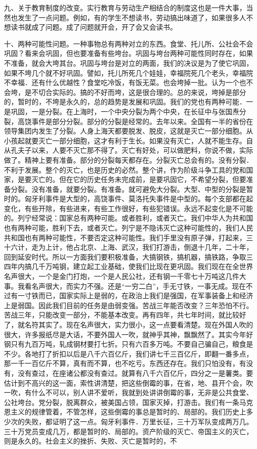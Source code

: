九、关于教育制度的改变。实行教育与劳动生产相结合的制度这也是一件大事，当然也发生了一点问题。例如，有的学生不想读书，劳动搞出味道了，如果很多人不想读书就成了问题。成了问题就开会，开了会又会读书。

十、两种可能性问题。一种事物总有两种对立的东西。食堂、托儿所、公社会不会巩固？看来会巩固，但也要准备有些垮台。巩固与垮台两种可能性同时存在，如果不准备，就会大垮其台。巩固与垮台是对立的两面，我们的决议是为了使它巩固，如果不垮几个就不好巩固。譬如，托儿所死几个娃娃，幸福院死几个老头，幸福院不幸福．还有什么优越性？食堂吃冷饭，有饭无菜。也会垮掉一批。认为一个也不会垮，是不切合实际的。搞的不好而垮，这是很合理的。总的来说，垮掉是部分的，暂时的，不垮是永久的，总的趋势是发展和巩固。我们的党也有两种可能．一是巩固，一是分裂。在上海时，一个中央分裂为两个中央，在长征中与张国焘分裂，高饶事件是部分分裂。部分的分裂是经常的。去年以来。全国有一半的省份在领导集团内发生了分裂。人身上海天都要脱发、脱皮，这就是灭亡一部分细胞。从小孩起就要灭亡一部分细胞，这才有利于生长。如果没有灭亡，人就不能生存。自从孔夫子以来，人要不灭亡那不得了。灭亡有好处，可以做肥料，你说不做，实际做了。精神上要有准备。部分的分裂每天都存在。分裂灭亡总会有的。没有分裂．不利于发展。整个的灭亡，也是历史的必然。整个讲，作为阶级斗争工具的党和国家，是要灭亡的。但在它的历史任务未完成前，是要巩固它，不希望分裂，但要准备分裂。没有准备，就要分裂。有准备。就可避免大分裂。大型、中型的分裂是暂时的。匈牙利事件是大型的，高饶事件、莫洛托失事件是中型的。每个支部都在起变化，有些开除，有些进来，有些工作很好，有些犯错误。永远不起变化是不可能的。列宁经常说：国家总有两种可能。或者胜利，或者灭亡。我们中华人为共和国也有两种可能，胜利下去，或者灭亡。列宁是不隐讳灭亡这种可能性的，我们人民共和国也有两种可能性，不要否定这种可能性。我们手里没有原子弹，打起来，三十六计，走为上计，他占北京、上海、武汉，我们打游击，倒退十几年，二十年，回到延安时代。所以一方面我们要积极准备，大搞钢铁，搞机器，搞铁路，争取三四年内搞几千万吨钢，建立起工业基础，使我们比现在更巩固。我们现在在全世界名声很大，一个是金门打炮，一个是人民公社，还有钢一千零七十万吨这几件大事。我看名声很大，而实力不强。还是“一穷二白”，手无寸铁，一事无成。现在不过有一寸铁而已，国家实际上是弱的，在政治上我们是强国，在军事装备上和经济上是弱国。因此我们目前的任务是由弱变强。苦战三年能否改变？三年恐怕不行。苦战三年，只能改变一部分，不能基本改变。再有四年，共七年时间，就比较好了，就名符其实了。现在名声很大，实力很小，这一点要看清楚。现在外国人吹的很大，许多报纸尽是大话，不要外国人一吹，就神乎其神，飘飘然了。其实今年好钢只有九百万吨，轧成钢材要打七折。只有六百多万吨。不要自己骗自己，粮食是不少。各地打了折扣以后是八千六百亿斤，我们讲七千三百亿斤，即翻一番多点，那一千一百亿斤不算，真有而不算，也不吃亏。东西还存在。我们只怕没有，有没有，没有查过，在座诸公都没有查过。就算有八千六百亿斤，四分之一是薯类。要估计到不高兴的这一面，索性讲清楚，把这些倒霉的事，在省，地、县开个会，吹一吹，有什么不可以，别人讲不爱听，我就到处讲讲倒霉的事，无非是公共食堂、公社垮台。党分裂，脱离群众，被美国占领，国家灭掉，打游击。我们有一条马克恩主义的规律管着，不管怎样，这些倒霉的事总是暂时的、局部的。我们历史上多少次的失败，都证明了这一点。匈牙利事件．万里长征，三十万军队变成两万几。三十万党员变成几万，都是暂时的、局部的。资产阶级的灭亡、帝国主义的灭亡，则是永久的。社会主义的挫折、失败、灭亡是暂时的，不